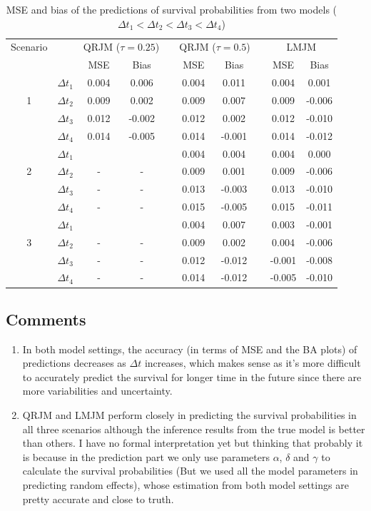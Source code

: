 \documentclass{article}
\begin{document}
\begin{table}[H]
\centering
\caption{MSE and bias of the predictions of survival probabilities from two models ($\Delta t_1<\Delta t_2<\Delta t_3<\Delta t_4$)}
\begin{tabular}{cccccccccc}
\hline
Scenario & & \multicolumn{2}{c}{QRJM ($\tau=0.25$)} & &\multicolumn{2}{c}{QRJM ($\tau=0.5$)} & & \multicolumn{2}{c}{LMJM} \\
\cline{3-4}\cline{6-7}\cline{9-10}
 & & MSE & Bias & & MSE & Bias & & MSE & Bias \\
\hline
\multirow{3}{*}{1} & $\Delta t_1$ & 0.004 & 0.006 && 0.004 & 0.011 & & 0.004 & 0.001 \\
& $\Delta t_2$ & 0.009 & 0.002 && 0.009 & 0.007 & & 0.009 & -0.006 \\
& $\Delta t_3$ & 0.012 & -0.002 &&  0.012 & 0.002 & & 0.012 & -0.010 \\
& $\Delta t_4$ & 0.014 & -0.005 &&  0.014 & -0.001 & & 0.014 & -0.012 \\
\hline
\multirow{3}{*}{2} & $\Delta t_1$ &  & && 0.004 & 0.004 & & 0.004 & 0.000 \\
& $\Delta t_2$ & - & - && 0.009 & 0.001 & & 0.009 & -0.006 \\
& $\Delta t_3$ & - & - && 0.013 & -0.003 & & 0.013 & -0.010 \\
& $\Delta t_4$ & - & - && 0.015 & -0.005 & & 0.015 & -0.011 \\
\hline
\multirow{3}{*}{3} & $\Delta t_1$ &  & && 0.004 & 0.007 & & 0.003 & -0.001 \\
& $\Delta t_2$ &- & - && 0.009 & 0.002 & & 0.004 & -0.006 \\
& $\Delta t_3$ &- & - && 0.012 & -0.012 & & -0.001 & -0.008 \\
& $\Delta t_4$ &- & - && 0.014 & -0.012 & & -0.005 & -0.010 \\
\hline
\end{tabular}
\end{table}




\subsection{Comments}
\begin{enumerate}
\item In both model settings, the accuracy (in terms of MSE and the BA plots) of predictions decreases as $\Delta t$ increases, which makes sense as it's more difficult to accurately predict the survival for longer time in the future since there are more variabilities and uncertainty.
\item QRJM and LMJM perform closely in predicting the survival probabilities in all three scenarios although the inference results from the true model is better than others. I have no formal interpretation yet but thinking that probably it is because in the prediction part we only use parameters $\alpha$, $\delta$ and $\gamma$ to calculate the survival probabilities (But we used all the model parameters in predicting random effects), whose estimation from both model settings are pretty accurate and close to truth.
\end{enumerate}
\end{document}
